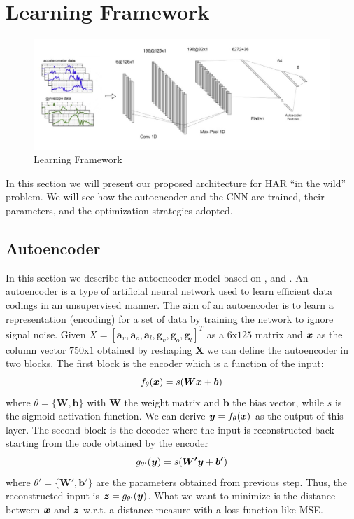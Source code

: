 \section{Learning Framework}
\label{sec:learning_framework}

\begin{figure}[h]
	\centering
	\includegraphics[width=1\textwidth]{images/full_architecture.jpg}
	\caption{Learning Framework}
	\label{fig:proposed-architecture}
\end{figure}

In this section we will present our proposed architecture for HAR ``in
the wild'' problem. We will see how the autoencoder and the CNN are
trained, their parameters, and the optimization strategies adopted.

\subsection{Autoencoder}
\label{subsec:autoencoder}

In this section we describe the autoencoder model based on
\cite{vincent2010stacked}, \cite{gu2018locomotion} and
\cite{gao2019human}. An autoencoder is a type of artificial neural
network used to learn efficient data codings in an unsupervised
manner. The aim of an autoencoder is to learn a representation
(encoding) for a set of data by training the network to ignore signal
noise. Given $X = [ \boldsymbol{a}_v, \boldsymbol{a}_o,
  \boldsymbol{a}_l, \boldsymbol{g}_v, \boldsymbol{g}_o,
  \boldsymbol{g}_l ]^T$ as a $6\text{x}125$ matrix and $\boldsymbol{x}$ as the
column vector $750\text{x}1$ obtained by reshaping $\boldsymbol{X}$ we
can define the autoencoder in two blocks. The first block is the
encoder which is a function of the input:
\begin{equation}
  f_\theta(\boldsymbol{x}) = s(\boldsymbol{W}\boldsymbol{x} + \boldsymbol{b})
\end{equation}
where $\theta = \{ \boldsymbol{W}, \boldsymbol{b} \}$ with
$\boldsymbol{W}$ the weight matrix and $\boldsymbol{b}$ the bias
vector, while $s$ is the sigmoid activation function. We
can derive $\boldsymbol{y} = f_\theta(\boldsymbol{x})$ as the output of this
layer. The second block is the decoder where the input is
reconstructed back starting from the code obtained by the encoder
\begin{equation}
  g_{\theta'}(\boldsymbol{y}) = s(\boldsymbol{W'}\boldsymbol{y} + \boldsymbol{b'})
\end{equation}
where $\theta' = \{ \boldsymbol{W'}, \boldsymbol{b'} \}$ are the
parameters obtained from previous step. Thus, the reconstructed input
is $\boldsymbol{z} = g_{\theta'}(\boldsymbol{y})$. What we want to minimize is the distance
between $\boldsymbol{x}$ and $\boldsymbol{z}$ w.r.t. a distance measure with a loss function
like MSE.

